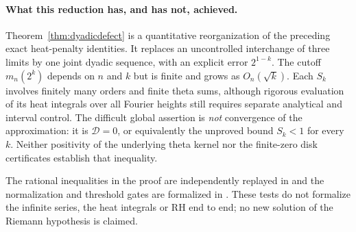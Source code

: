 \paragraph{What this reduction has, and has not, achieved.}
Theorem~\ref{thm:dyadicdefect} is a quantitative
reorganization of the preceding exact heat-penalty
identities. It replaces an uncontrolled interchange
of three limits by one joint dyadic sequence, with
an explicit error $2^{1-k}$.
The cutoff $m_n(2^k)$ depends on $n$ and $k$
but is finite and grows as $O_n(\sqrt{k})$.
Each $S_k$ involves finitely many orders and
finite theta sums, although rigorous evaluation
of its heat integrals over all Fourier heights
still requires separate analytical and interval
control. The difficult global assertion is
\emph{not} convergence of the approximation:
it is $\mathscr D=0$, or equivalently the
unproved bound $S_k<1$ for every $k$.
Neither positivity of the underlying theta
kernel nor the finite-zero disk certificates
establish that inequality.

The rational inequalities in the proof are
independently replayed in
and the normalization and threshold gates are
formalized in .
These tests do not formalize the infinite
series, the heat integrals or RH end to end;
no new solution of the Riemann hypothesis
is claimed.
